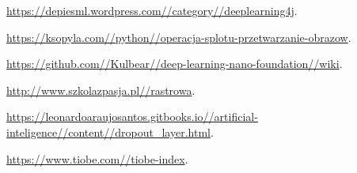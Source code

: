 \documentclass[a4paper,12pt]{article}
\begin{document}
\begin{thebibliography}{99}
            \href{https://depiesml.wordpress.com//category//deeplearning4j}{\url{https://depiesml.wordpress.com//category//deeplearning4j}}.
    
            \href{https://ksopyla.com//python//operacja-splotu-przetwarzanie-obrazow}{\url{https://ksopyla.com//python//operacja-splotu-przetwarzanie-obrazow}}.
                
            \href{https://github.com//Kulbear//deep-learning-nano-foundation//wiki//ReLU-and-Softmax-Activation-Functions}{\url{https://github.com//Kulbear//deep-learning-nano-foundation//wiki}}.
    
            \href{http://www.szkolazpasja.pl//rastrowa}{\url{http://www.szkolazpasja.pl//rastrowa}}.
            
              \href{https://leonardoaraujosantos.gitbooks.io//artificial-inteligence//content//dropout_layer.html}{\url{https://leonardoaraujosantos.gitbooks.io//artificial-inteligence//content//dropout_layer.html}}.
                
            \href{https://www.tiobe.com//tiobe-index}{\url{https://www.tiobe.com//tiobe-index}}.
        \end{thebibliography}
	        
\end{document}
